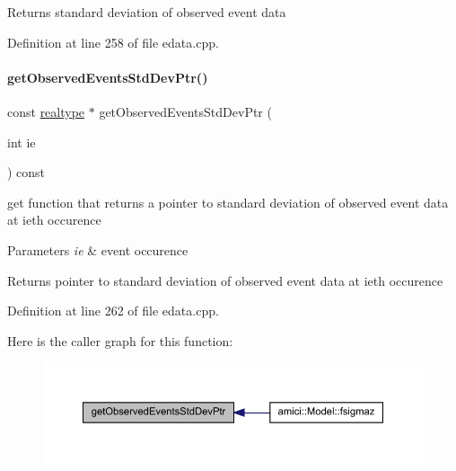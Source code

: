 \begin{DoxyReturn}{Returns}
standard deviation of observed event data 
\end{DoxyReturn}


Definition at line 258 of file edata.\+cpp.

\mbox{\label{classamici_1_1_exp_data_aabab4dfc080fdf961b6a3bbf1aebd631}} 
\paragraph{\texorpdfstring{get\+Observed\+Events\+Std\+Dev\+Ptr()}{getObservedEventsStdDevPtr()}}
{\footnotesize\ttfamily const \mbox{\hyperlink{namespaceamici_a1bdce28051d6a53868f7ccbf5f2c14a3}{realtype}} $\ast$ get\+Observed\+Events\+Std\+Dev\+Ptr (\begin{DoxyParamCaption}\item[{int}]{ie }\end{DoxyParamCaption}) const}

get function that returns a pointer to standard deviation of observed event data at ieth occurence


\begin{DoxyParams}{Parameters}
{\em ie} & event occurence \\
\hline
\end{DoxyParams}
\begin{DoxyReturn}{Returns}
pointer to standard deviation of observed event data at ieth occurence 
\end{DoxyReturn}


Definition at line 262 of file edata.\+cpp.

Here is the caller graph for this function\+:
\nopagebreak
\begin{figure}[H]
\begin{center}
\leavevmode
\includegraphics[width=350pt]{classamici_1_1_exp_data_aabab4dfc080fdf961b6a3bbf1aebd631_icgraph}
\end{center}
\end{figure}
\mbox{\label{classamici_1_1_exp_data_acad115e928a8b0bc8e90ebf9553d3eed}} 
